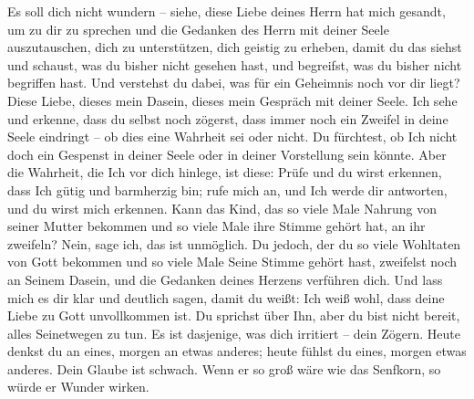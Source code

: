 Es soll dich nicht wundern -- siehe, diese Liebe deines Herrn hat mich gesandt, um zu dir zu sprechen und die Gedanken des Herrn mit deiner Seele auszutauschen, dich zu unterstützen, dich geistig zu erheben, damit du das siehst und schaust, was du bisher nicht gesehen hast, und begreifst, was du bisher nicht begriffen hast. Und verstehst du dabei, was für ein Geheimnis noch vor dir liegt? Diese Liebe, dieses mein Dasein, dieses mein Gespräch mit deiner Seele. Ich sehe und erkenne, dass du selbst noch zögerst, dass immer noch ein Zweifel in deine Seele eindringt -- ob dies eine Wahrheit sei oder nicht. Du fürchtest, ob Ich nicht doch ein Gespenst in deiner Seele oder in deiner Vorstellung sein könnte. Aber die Wahrheit, die Ich vor dich hinlege, ist diese: Prüfe und du wirst erkennen, dass Ich gütig und barmherzig bin; rufe mich an, und Ich werde dir antworten, und du wirst mich erkennen. Kann das Kind, das so viele Male Nahrung von seiner Mutter bekommen und so viele Male ihre Stimme gehört hat, an ihr zweifeln? Nein, sage ich, das ist unmöglich. Du jedoch, der du so viele Wohltaten von Gott bekommen und so viele Male Seine Stimme gehört hast, zweifelst noch an Seinem Dasein, und die Gedanken deines Herzens verführen dich. Und lass mich es dir klar und deutlich sagen, damit du weißt: Ich weiß wohl, dass deine Liebe zu Gott unvollkommen ist. Du sprichst über Ihn, aber du bist nicht bereit, alles Seinetwegen zu tun. Es ist dasjenige, was dich irritiert -- dein Zögern. Heute denkst du an eines, morgen an etwas anderes; heute fühlst du eines, morgen etwas anderes. Dein Glaube ist schwach. Wenn er so groß wäre wie das Senfkorn, so würde er Wunder wirken.

